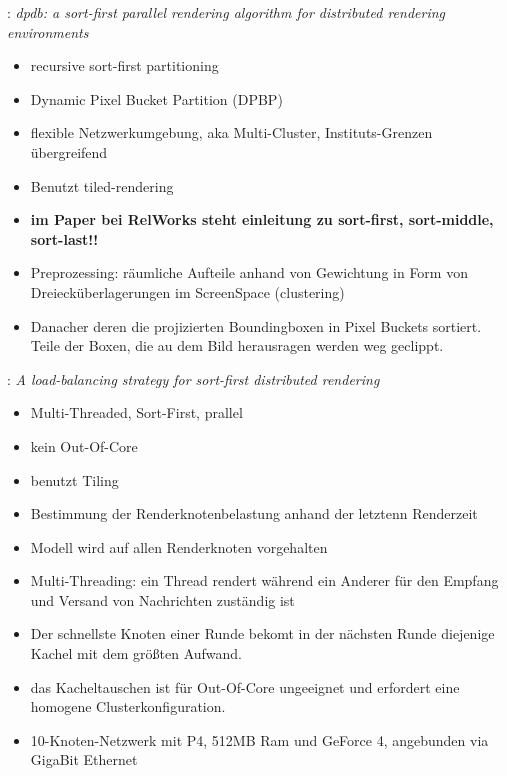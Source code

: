 \cite{dpbp}: \textit{dpdb: a sort-first parallel rendering algorithm for distributed rendering environments}
\begin{itemize}
 \item recursive sort-first partitioning
 \item Dynamic Pixel Bucket Partition (DPBP)
 \item flexible Netzwerkumgebung, aka Multi-Cluster, Instituts-Grenzen übergreifend
 \item Benutzt tiled-rendering
 \item \textbf{im Paper bei RelWorks steht einleitung zu sort-first, sort-middle, sort-last!!}
 \item Preprozessing: räumliche Aufteile anhand von Gewichtung in Form von Dreiecküberlagerungen im ScreenSpace (clustering)
 \item Danacher deren die projizierten Boundingboxen in Pixel Buckets sortiert. Teile der Boxen, die au dem Bild herausragen werden weg geclippt.
\end{itemize}

\cite{abraham}: \textit{A load-balancing strategy for sort-first distributed rendering}
\begin{itemize}
 \item Multi-Threaded, Sort-First, prallel
 \item kein Out-Of-Core
 \item benutzt Tiling
 \item Bestimmung der Renderknotenbelastung anhand der letztenn Renderzeit
 \item Modell wird auf allen Renderknoten vorgehalten
 \item Multi-Threading: ein Thread rendert während ein Anderer für den Empfang und Versand von Nachrichten zuständig ist
 \item Der schnellste Knoten einer Runde bekomt in der nächsten Runde diejenige Kachel mit dem größten Aufwand.
 \item das Kacheltauschen ist für Out-Of-Core ungeeignet und erfordert eine homogene Clusterkonfiguration.
 \item 10-Knoten-Netzwerk mit P4, 512MB Ram und GeForce 4, angebunden via GigaBit Ethernet
\end{itemize}

